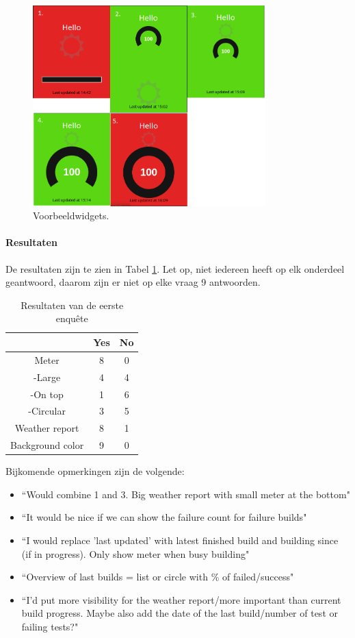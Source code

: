 \documentclass[10pt,a4paper]{article}
\begin{document}
\begin{appendices}
\begin{figure}[ht!]
\centering
\includegraphics[width=90mm]{proposals.png}
\caption{Voorbeeldwidgets.} 
\label{proposals}
\end{figure} 

\paragraph{Resultaten}
De resultaten zijn te zien in Tabel \ref{results}. Let op, niet iedereen heeft op elk onderdeel geantwoord, daarom zijn er niet op elke vraag 9 antwoorden.

\begin{table}[h!]
\centering
\begin{tabular}{|c|c|c|}
\hline                         										
		 			&	Yes 		&	No		\\	\hline	\hline
Meter				&	8			&	0		\\	\hline
-Large				&	4			&	4		\\	\hline
-On top				&	1			&	6		\\	\hline	
-Circular			&	3			&	5		\\	\hline
Weather report		&	8			&	1		\\	\hline
Background color	&	9			&	0		\\	\hline
\end{tabular}
\caption{Resultaten van de eerste enqu\^ete}
\label{results}
\end{table}

Bijkomende opmerkingen zijn de volgende:
\begin{itemize}
\item ``Would combine 1 and 3. Big weather report with small meter at the bottom"
\item ``It would be nice if we can show the failure count for failure builds"
\item ``I would replace 'last updated' with latest finished build and building since (if in progress). Only show meter when busy building"
\item ``Overview of last builds = list or circle with \% of failed/success"
\item ``I'd put more visibility for the weather report/more important than current build progress. Maybe also add the date of the last build/number of test or failing tests?"
\end{itemize}


\end{appendices}
\end{document}
